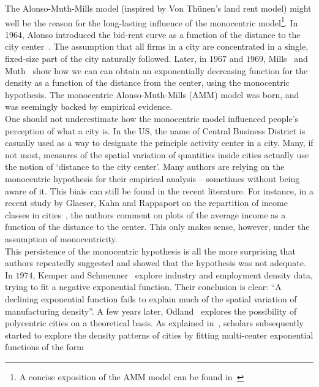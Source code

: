 The Alonso-Muth-Mills model (inspired by Von Th\"unen's land rent model)  might
well be the reason for the long-lasting influence of the monocentric
model\footnote{A concise exposition of the AMM model can be found
in~\cite{Brueckner:1987,Fujita:1989}}. In 1964, Alonso introduced the bid-rent
curve as a function of the distance to the city center~\cite{Alonso:1964}. The
assumption that all firms in a city are concentrated in a single, fixed-size
part of the city naturally followed. Later, in $1967$ and $1969$,
Mills~\cite{Mills:1967} and Muth~\cite{Muth:1969} show how we can can obtain an
exponentially decreasing function for the density as a function of the distance
from the center, using the monocentric hypothesis. The monocentric
Alonso-Muth-Mills (AMM) model was born, and was seemingly backed by empirical
evidence.\\


One should not underestimate how the monocentric model influenced people's
perception of what a city is. In the US, the name of Central Business District
is casually used as a way to designate the principle activity center in a city.
Many, if not most, measures of the spatial variation of quantities inside cities
actually use the notion of `distance to the city center'. Many authors are
relying on the monocentric hypothesis for their empirical analysis -- sometimes
without being aware of it. This biais can still be found in the recent
literature. For instance, in a recent study by Glaeser, Kahn and Rappaport on the
repartition of income classes in cities~\cite{Glaeser:2008}, the authors comment
on plots of the average income as a function of the distance to the center. This
only makes sense, however, under the assumption of monocentricity.\\


This persistence of the monocentric hypothesis is all the more surprising that
authors repeatedly suggested and showed that the hypothesis was not adequate. In
$1974$, Kemper and Schmenner~\cite{Kemper:1974} explore industry and
employment density data, trying to fit a negative exponential function. Their
conclusion is clear: ``A declining exponential function fails to explain much of
the spatial variation of manufacturing density''. A few years later,
Odland~\cite{Odland:1978} explores the possibility of polycentric cities on a
theoretical basis. As explained in~\cite{Griffith:1981}, scholars subsequently started to
explore the density patterns of cities by fitting multi-center exponential
functions of the form

